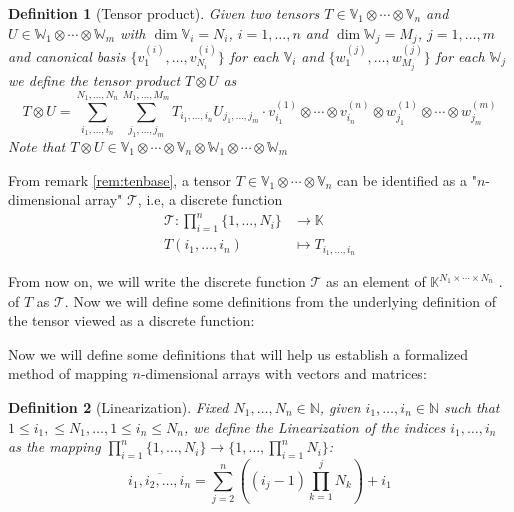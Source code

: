 \documentclass[11pt,a4paper,openright,oneside]{book}
\numberwithin{equation}{section}
\newtheorem{defn0}{Definition}[chapter]
\newenvironment{definition}{ \begin{defn0}}{\end{defn0}}
\begin{document}
\begin{definition}[Tensor product] Given two tensors $T \in \mathbb{V}_1 \otimes \cdots \otimes \mathbb{V}_n$ and ${U \in \mathbb{W}_1 \otimes \cdots \otimes
    \mathbb{W}_m}$ with $\dim \mathbb{V}_i = N_i$, $i = 1, \dots, n$ and $\dim \mathbb{W}_j = M_j$, $j = 1, \dots, m$ 
    and canonical basis $\{v_1^{(i)}, \dots, v_{N_i}^{(i)}\}$ for each $\mathbb{V}_i$ and $\{w_1^{(j)}, \dots, w_{M_j}^{(j)}\}$ for each $\mathbb{W}_j$
    we define the tensor product
    $T \otimes U$ as
    $$ T \otimes U = \sum_{i_1, \dots, i_n}^{N_1, \dots, N_n} \sum_{j_1, \dots, j_m}^{M_1, \dots, M_m} T_{i_1, \dots, i_n} U_{j_1, \dots, j_m} \cdot
    v_{i_1}^{(1)} \otimes \cdots \otimes v_{i_n}^{(n)} \otimes w_{j_1}^{(1)} \otimes \cdots \otimes w_{j_m}^{(m)}$$
    Note that $T \otimes U \in \mathbb{V}_1 \otimes \cdots \otimes \mathbb{V}_n \otimes \mathbb{W}_1 \otimes \cdots \otimes \mathbb{W}_m$

\end{definition}

From remark \ref{rem:tenbase}, a tensor $T \in \mathbb{V}_1 \otimes \cdots \otimes \mathbb{V}_n$ can be identified as a "$n$-dimensional array" $\mathcal{T}$, i.e,
a discrete function
$$\begin{align}
    \mathcal{T}: \prod_{i=1}^n \{1, \dots, N_i\} & \longrightarrow \mathbb{K} \\
    T(i_1, \dots, i_n) & \longmapsto T_{i_1, \dots, i_n}
\end{align}$$

From now on, we will write the discrete function $\mathcal{T}$ as
an element of ${\mathbb{K}^{N_1 \times \cdots \times N_n}}$ \cite{yokotaVeryBasicsTensors2024}.
of $T$ as $\mathcal{T}$. Now we will define some definitions from the underlying definition of the tensor viewed as a discrete function:

Now we will define some definitions that will help us establish a formalized method of mapping $n$-dimensional arrays with
vectors and matrices:

\begin{definition}[Linearization]
    Fixed $N_1, \dots, N_n \in \mathbb{N}$, given $i_1, \dots, i_n \in \mathbb{N}$ such that $1 \leqslant i_1, \leqslant N_1, \dots, 1 \leqslant i_n \leqslant N_n$,
    we define the Linearization of the indices $i_1, \dots, i_n$ as the mapping ${\prod_{i=1}^n \{1, \dots, N_i\} \rightarrow \{1, \dots, \prod_{i=1}^n N_i\}}$:
    $$\overline {i_1, i_2, \dots, i_n} = \sum_{j=2}^{n} \left( (i_j - 1) \prod_{k=1}^j N_k \right) + i_1$$
\end{definition}
\end{document}

